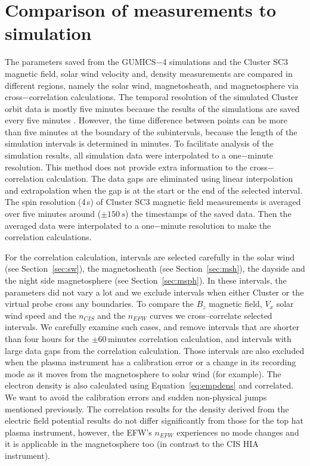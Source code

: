 \documentclass[linenumbers,draft]{agujournal}
\begin{document}
\section{Comparison of measurements to simulation}
\label{sec:comp}

The parameters saved from the GUMICS$-$4 simulations and the Cluster SC3 magnetic field, solar wind velocity and, density measurements are compared in different regions, namely the solar wind, magnetosheath, and magnetosphere via cross$-$correlation calculations. The temporal resolution of the simulated Cluster orbit data is mostly five minutes because the results of the simulations are saved every five minutes \citep{facsko16:_one_earth}. However, the time difference between points can be more than five minutes at the boundary of the subintervals, because the length of the simulation intervals is determined in minutes. To facilitate analysis of the simulation results, all simulation data were interpolated to a one$-$minute resolution. This method does not provide extra information to the cross$-$correlation calculation. The data gaps are eliminated using linear interpolation and extrapolation when the gap is at the start or the end of the selected interval. The spin resolution (4\,s) of Cluster SC3 magnetic field measurements is averaged over five minutes around ($\pm150\,s$) the timestamps of the saved data. Then the averaged data were interpolated to a one$-$minute resolution to make the correlation calculations.

For the correlation calculation, intervals are selected carefully in the solar wind (see Section~\ref{sec:sw}), the magnetosheath (see Section~\ref{sec:msh}), the dayside and the night side magnetosphere (see Section~\ref{sec:msph}). In these intervals, the parameters did not vary a lot and we exclude intervals when either Cluster or the virtual probe cross any boundaries. To compare the $B_z$ magnetic field, $V_x$ solar wind speed and the $n_{CIS}$ and the $n_{EFW}$ curves we cross--correlate selected intervals. We carefully examine such cases, and remove intervals that are shorter than four hours for the $\pm$60\,minutes correlation calculation, and intervals with large data gaps from the correlation calculation. Those intervals are also excluded when the plasma instrument has a calibration error or a change in its recording mode as it moves from the magnetosphere to solar wind (for example). The electron density is also calculated using Equation~\ref{eq:empdens} and correlated. We want to avoid the calibration errors and sudden non-physical jumps mentioned previously. The correlation results for the density derived from the electric field potential results do not differ significantly from those for the top hat plasma instrument, however, the EFW's $n_{EFW}$ experiences no mode changes and it is applicable in the magnetosphere too (in contrast to the CIS HIA instrument).
\end{document}
